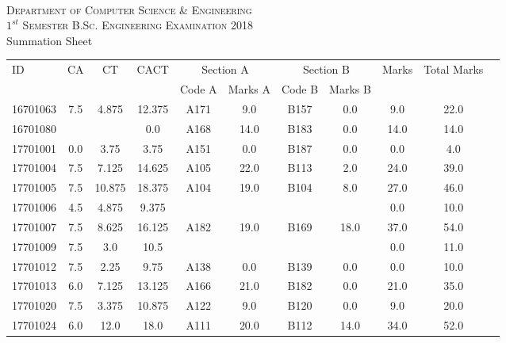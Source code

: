 \documentclass[12pt]{article}
\begin{document}
    \centering
    \begin{minipage}[m]{.8\textwidth} \centering 
	\smallskip
	\\
	\textsc{Department of Computer Science \& Engineering}\\
	\textsc{$1^{st}$ Semester B.Sc. Engineering Examination 2018}\\
	{\large {\sc Summation Sheet}}\\  
    \end{minipage} 
    \begin{center} 
	\renewcommand{\arraystretch}{1.08}
	\begin{small}
    \begin{tabular}{|l|c|c|c|c|c|c|c|c|c|c|} \hline
	\multirow{2}{*}{ID} & 	\multirow{2}{*}{CA}  & 	\multirow{2}{*}{CT}  & 	\multirow{2}{*}{CACT}  & \multicolumn{2 }{|c|}{Section A}& \multicolumn{2 }{c|}{Section B} & 	\multirow{2}{*}{Marks}  & 	\multirow{2}{*}{Total Marks}  \\ 
	&  &  &  & Code A & Marks A & Code B & Marks B&  &  \\ \hline
16701063 & 7.5 & 4.875 & 12.375 & A171 & 9.0 & B157 & 0.0 & 9.0 & 22.0\\ \hline 
16701080 &  &  & 0.0 & A168 & 14.0 & B183 & 0.0 & 14.0 & 14.0\\ \hline 
17701001 & 0.0 & 3.75 & 3.75 & A151 & 0.0 & B187 & 0.0 & 0.0 & 4.0\\ \hline 
17701004 & 7.5 & 7.125 & 14.625 & A105 & 22.0 & B113 & 2.0 & 24.0 & 39.0\\ \hline 
17701005 & 7.5 & 10.875 & 18.375 & A104 & 19.0 & B104 & 8.0 & 27.0 & 46.0\\ \hline 
17701006 & 4.5 & 4.875 & 9.375 &  &  &  &  & 0.0 & 10.0\\ \hline 
17701007 & 7.5 & 8.625 & 16.125 & A182 & 19.0 & B169 & 18.0 & 37.0 & 54.0\\ \hline 
17701009 & 7.5 & 3.0 & 10.5 &  &  &  &  & 0.0 & 11.0\\ \hline 
17701012 & 7.5 & 2.25 & 9.75 & A138 & 0.0 & B139 & 0.0 & 0.0 & 10.0\\ \hline 
17701013 & 6.0 & 7.125 & 13.125 & A166 & 21.0 & B182 & 0.0 & 21.0 & 35.0\\ \hline 
17701020 & 7.5 & 3.375 & 10.875 & A122 & 9.0 & B120 & 0.0 & 9.0 & 20.0\\ \hline 
17701024 & 6.0 & 12.0 & 18.0 & A111 & 20.0 & B112 & 14.0 & 34.0 & 52.0\\ \hline 

\end{tabular}
\end{small}
\end{center}
\end{document}
